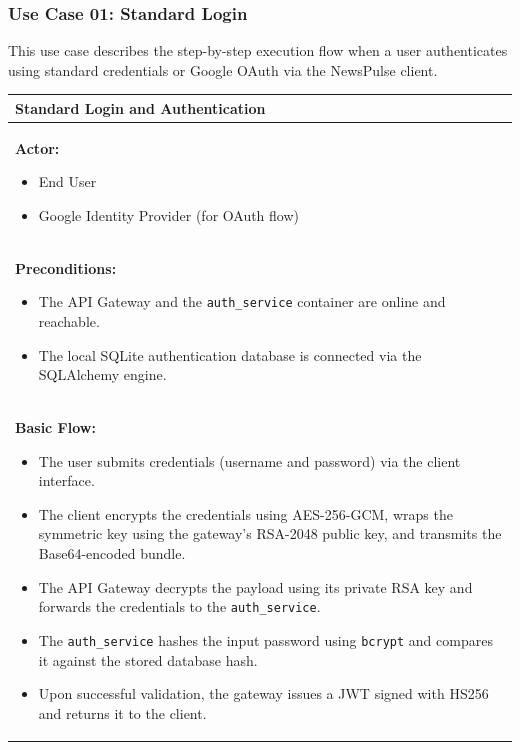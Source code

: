 \subsubsection{Use Case 01: Standard Login}
This use case describes the step-by-step execution flow when a user authenticates using standard credentials or Google OAuth via the NewsPulse client.
\begin{table}[H]
    \renewcommand{\arraystretch}{1.3}
    \begin{tabularx}{\textwidth}{| X |}
        \hline
        \textbf{Standard Login and Authentication} \\
        \hline
        \textbf{Actor:}
        \begin{itemize}
            \item End User
            \item Google Identity Provider (for OAuth flow)
        \end{itemize} \\
        \hline
        \textbf{Preconditions:}
        \begin{itemize}
            \item The API Gateway and the \texttt{auth\_service} container are online and reachable.
            \item The local SQLite authentication database is connected via the SQLAlchemy engine.
        \end{itemize} \\
        \hline
        \textbf{Basic Flow:}
        \begin{itemize}
            \item The user submits credentials (username and password) via the client interface.
            \item The client encrypts the credentials using AES-256-GCM, wraps the symmetric key using the gateway's RSA-2048 public key, and transmits the Base64-encoded bundle.
            \item The API Gateway decrypts the payload using its private RSA key and forwards the credentials to the \texttt{auth\_service}.
            \item The \texttt{auth\_service} hashes the input password using \texttt{bcrypt} and compares it against the stored database hash.
            \item Upon successful validation, the gateway issues a JWT signed with HS256 and returns it to the client.
        \end{itemize} \\

\end{tabularx}
\end{table}
